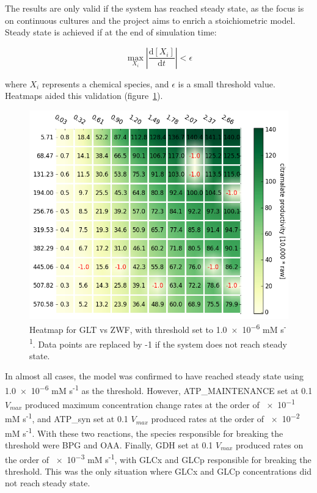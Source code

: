 \documentclass[parskip=full, numbers=noenddot]{scrreprt}
\begin{document}
The results are only valid if the system has reached steady state, as the focus is on continuous cultures and the project aims to enrich a stoichiometric model. Steady state is achieved if at the end of simulation time:

\begin{equation}
  \max_{X_{i}} \left | \frac{\mathrm{d}[X_{i}]}{\mathrm{d}t} \right | < \epsilon
\end{equation}
\label{eqn:steadystate}

where $X_{i}$ represents a chemical species, and $\epsilon$ is a small threshold value. Heatmaps aided this validation (figure~\ref{fig:steadystate}).

\begin{figure}[hbp]
  \centering
  \includegraphics[scale=0.5]{steadystate}
  \caption{Heatmap for GLT vs ZWF, with threshold set to \num{1.0e-6} mM s\textsuperscript{-1}. Data points are replaced by -1 if the system does not reach steady state.}
  \label{fig:steadystate}
\end{figure}


In almost all cases, the model was confirmed to have reached steady state using \num{1.0e-6} mM s\textsuperscript{-1} as the threshold. However, ATP\_MAIN\-TEN\-ANCE set at 0.1 $V_{max}$ produced maximum concentration change rates at the order of \num{e-1} mM s\textsuperscript{-1}, and ATP\_syn set at 0.1 $V_{max}$ produced rates at the order of \num{e-2} mM s\textsuperscript{-1}. With these two reactions, the species responsible for breaking the threshold were BPG and OAA.
Finally, GDH set at 0.1 $V_{max}$ produced rates on the order of \num{e-3} mM s\textsuperscript{-1}, with GLCx and GLCp responsible for breaking the threshold. This was the only situation where GLCx and GLCp concentrations did not reach steady state.
\end{document}
